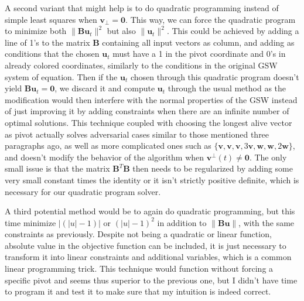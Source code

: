 \documentclass[12pt]{article}
\begin{document}

A second variant that might help is to do quadratic programming instead of simple least squares when $\textbf{v}_\perp=\textbf{0}$. This way, we can force the quadratic program to minimize both $\|\textbf{Bu}_t\|^2$ but also $\|\textbf{u}_t\|^2$. This could be achieved by adding a line of 1's to the matrix $\textbf{B}$ containing all input vectors as column, and adding as conditions that the chosen $\textbf{u}_t$ must have a 1 in the pivot coordinate and 0's in already colored coordinates, similarly to the conditions in the original GSW system of equation. Then if the $\textbf{u}_t$ chosen through this quadratic program doesn't yield $\textbf{Bu}_t=\textbf{0}$, we discard it and compute $\textbf{u}_t$ through the usual method as the modification would then interfere with the normal properties of the GSW instead of just improving it by adding constraints when there are an infinite number of optimal solutions. This technique coupled with choosing the longest alive vector as pivot actually solves adversarial cases similar to those mentioned three paragraphs ago, as well as more complicated ones such as $\{\textbf{v},\textbf{v},\textbf{v},3\textbf{v},\textbf{w},\textbf{w},2\textbf{w}\}$, and doesn't modify the behavior of the algorithm when $\textbf{v}^\perp(t)\not=\textbf{0}$. The only small issue is that the matrix $\textbf{B}^T\textbf{B}$ then needs to be regularized by adding some very small constant times the identity or it isn't strictly positive definite, which is necessary for our quadratic program solver.

A third potential method would be to again do quadratic programming, but this time minimize $|(|u|-1)|$ or $(|u|-1)^2$ in addition to $\|\textbf{Bu}\|$, with the same constraints as previously. Despite not being a quadratic or linear function, absolute value in the objective function can be included, it is just necessary to transform it into linear constraints and additional variables, which is a common linear programming trick. This technique would function without forcing a specific pivot and seems thus superior to the previous one, but I didn't have time to program it and test it to make sure that my intuition is indeed correct.
\end{document}
